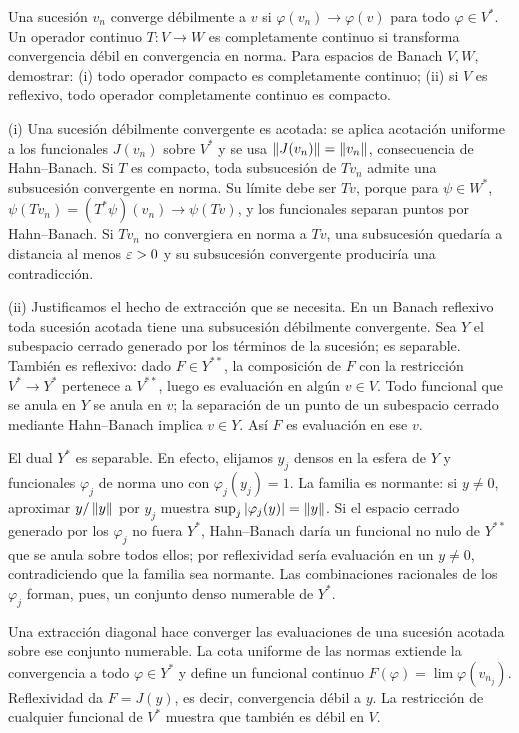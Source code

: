 \begin{ejercicio}\label{ej:v2-l21-5}
Una sucesión $v_n$ converge débilmente a $v$ si $\varphi(v_n)\to\varphi(v)$ para todo $\varphi\in V^*$. Un operador continuo $T:V\to W$ es completamente continuo si transforma convergencia débil en convergencia en norma. Para espacios de Banach $V,W$, demostrar: (i) todo operador compacto es completamente continuo; (ii) si $V$ es reflexivo, todo operador completamente continuo es compacto.
\end{ejercicio}
\begin{solucion}
(i) Una sucesión débilmente convergente es acotada: se aplica acotación uniforme a los funcionales $J(v_n)$ sobre $V^*$ y se usa $\left\lVert J(v_n)\right\rVert=\left\lVert v_n\right\rVert$, consecuencia de Hahn--Banach. Si $T$ es compacto, toda subsucesión de $Tv_n$ admite una subsucesión convergente en norma. Su límite debe ser $Tv$, porque para $\psi\in W^*$, $\psi(Tv_n)=(T^*\psi)(v_n)\to\psi(Tv)$, y los funcionales separan puntos por Hahn--Banach. Si $Tv_n$ no convergiera en norma a $Tv$, una subsucesión quedaría a distancia al menos $\varepsilon>0$ y su subsucesión convergente produciría una contradicción.

(ii) Justificamos el hecho de extracción que se necesita. En un Banach reflexivo toda sucesión acotada tiene una subsucesión débilmente convergente. Sea $Y$ el subespacio cerrado generado por los términos de la sucesión; es separable. También es reflexivo: dado $F\in Y^{**}$, la composición de $F$ con la restricción $V^*\to Y^*$ pertenece a $V^{**}$, luego es evaluación en algún $v\in V$. Todo funcional que se anula en $Y$ se anula en $v$; la separación de un punto de un subespacio cerrado mediante Hahn--Banach implica $v\in Y$. Así $F$ es evaluación en ese $v$.

El dual $Y^*$ es separable. En efecto, elijamos $y_j$ densos en la esfera de $Y$ y funcionales $\varphi_j$ de norma uno con $\varphi_j(y_j)=1$. La familia es normante: si $y\ne0$, aproximar $y/\left\lVert y\right\rVert$ por $y_j$ muestra $\sup_j|\varphi_j(y)|=\left\lVert y\right\rVert$. Si el espacio cerrado generado por los $\varphi_j$ no fuera $Y^*$, Hahn--Banach daría un funcional no nulo de $Y^{**}$ que se anula sobre todos ellos; por reflexividad sería evaluación en un $y\ne0$, contradiciendo que la familia sea normante. Las combinaciones racionales de los $\varphi_j$ forman, pues, un conjunto denso numerable de $Y^*$.

Una extracción diagonal hace converger las evaluaciones de una sucesión acotada sobre ese conjunto numerable. La cota uniforme de las normas extiende la convergencia a todo $\varphi\in Y^*$ y define un funcional continuo $F(\varphi)=\lim\varphi(v_{n_j})$. Reflexividad da $F=J(y)$, es decir, convergencia débil a $y$. La restricción de cualquier funcional de $V^*$ muestra que también es débil en $V$.


\end{solucion}
